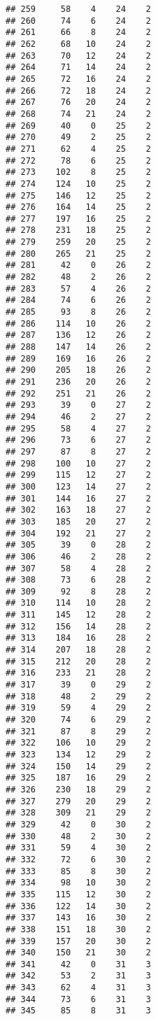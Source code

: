 \documentclass[
]{article}
\begin{document}
\begin{verbatim}
## 259     58    4    24    2
## 260     74    6    24    2
## 261     66    8    24    2
## 262     68   10    24    2
## 263     70   12    24    2
## 264     71   14    24    2
## 265     72   16    24    2
## 266     72   18    24    2
## 267     76   20    24    2
## 268     74   21    24    2
## 269     40    0    25    2
## 270     49    2    25    2
## 271     62    4    25    2
## 272     78    6    25    2
## 273    102    8    25    2
## 274    124   10    25    2
## 275    146   12    25    2
## 276    164   14    25    2
## 277    197   16    25    2
## 278    231   18    25    2
## 279    259   20    25    2
## 280    265   21    25    2
## 281     42    0    26    2
## 282     48    2    26    2
## 283     57    4    26    2
## 284     74    6    26    2
## 285     93    8    26    2
## 286    114   10    26    2
## 287    136   12    26    2
## 288    147   14    26    2
## 289    169   16    26    2
## 290    205   18    26    2
## 291    236   20    26    2
## 292    251   21    26    2
## 293     39    0    27    2
## 294     46    2    27    2
## 295     58    4    27    2
## 296     73    6    27    2
## 297     87    8    27    2
## 298    100   10    27    2
## 299    115   12    27    2
## 300    123   14    27    2
## 301    144   16    27    2
## 302    163   18    27    2
## 303    185   20    27    2
## 304    192   21    27    2
## 305     39    0    28    2
## 306     46    2    28    2
## 307     58    4    28    2
## 308     73    6    28    2
## 309     92    8    28    2
## 310    114   10    28    2
## 311    145   12    28    2
## 312    156   14    28    2
## 313    184   16    28    2
## 314    207   18    28    2
## 315    212   20    28    2
## 316    233   21    28    2
## 317     39    0    29    2
## 318     48    2    29    2
## 319     59    4    29    2
## 320     74    6    29    2
## 321     87    8    29    2
## 322    106   10    29    2
## 323    134   12    29    2
## 324    150   14    29    2
## 325    187   16    29    2
## 326    230   18    29    2
## 327    279   20    29    2
## 328    309   21    29    2
## 329     42    0    30    2
## 330     48    2    30    2
## 331     59    4    30    2
## 332     72    6    30    2
## 333     85    8    30    2
## 334     98   10    30    2
## 335    115   12    30    2
## 336    122   14    30    2
## 337    143   16    30    2
## 338    151   18    30    2
## 339    157   20    30    2
## 340    150   21    30    2
## 341     42    0    31    3
## 342     53    2    31    3
## 343     62    4    31    3
## 344     73    6    31    3
## 345     85    8    31    3

\end{verbatim}
\end{document}
